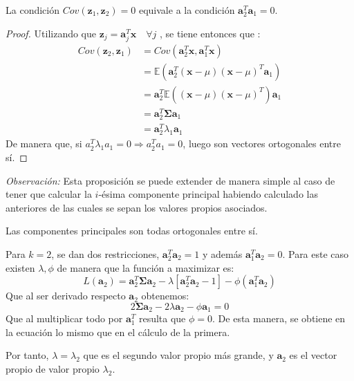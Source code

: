 \begin{propo}
La condición $Cov(\textbf{z}_1,\textbf{z}_2)=0 $ equivale a la condición $\textbf{a}_2^T\textbf{a}_1 = 0$.
\begin{proof}
Utilizando que $\textbf{z}_j=\textbf{a}_j^T \textbf{x}\quad \forall j$ , se tiene entonces que :
\begin{align*}
Cov(\textbf{z}_2,\textbf{z}_1)&= Cov (\textbf{a}_2^T\textbf{x},\textbf{a}_1^T\textbf{x})\\ 
&= \mathbb{E}(\textbf{a}_2^T(\textbf{x}-\mu)(\textbf{x}-\mu)^T \textbf{a}_1)\\
&= \textbf{a}_2^T \mathbb{E}((\textbf{x}-\mu)(\textbf{x}-\mu)^T) \textbf{a}_1\\
&= \textbf{a}_2^T \mathbf{\Sigma} \textbf{a}_1 \\
&= \textbf{a}_2^T \lambda_1 \textbf{a}_1
\end{align*}
\noindent De manera que, si $a_2^T \lambda_1 a_1 = 0 \Rightarrow a_2^T a_1=0 $, luego son vectores ortogonales entre sí.
\end{proof}
\end{propo}


\noindent \emph{Observación: } Esta proposición se puede extender de manera simple al caso de tener que calcular la $i$-ésima componente principal habiendo calculado las anteriores de las cuales se sepan los valores propios asociados. 

\begin{coro}
Las componentes principales son todas ortogonales entre sí. 
\end{coro}

\noindent Para $k=2$, se dan dos restricciones, $\textbf{a}_2^T\textbf{a}_2=1$ y además $\textbf{a}_1^T \textbf{a}_2=0$. Para este caso existen $\lambda, \phi$ de manera que la función a maximizar es:
\begin{equation}
 L(\textbf{a}_2)=\textbf{a}_2^T \mathbf{\Sigma} \textbf{a}_2 - \lambda[\textbf{a}_2^T \textbf{a}_2-1]-\phi(\textbf{a}_1^T \textbf{a}_2)
\end{equation}
Que al ser derivado respecto $\textbf{a}_2$ obtenemos:
\begin{equation}
2\mathbf{\Sigma} \textbf{a}_2 - 2\lambda\textbf{a}_2-\phi \textbf{a}_1=0
\end{equation}
Que al multiplicar todo por $\textbf{a}_1^T$ resulta que $\phi=0$. De esta manera, se obtiene en la ecuación lo mismo que en el cálculo de la primera. 

\noindent Por tanto, $\lambda=\lambda_2$ que es el segundo valor propio más grande, y $\textbf{a}_2$ es el vector propio de valor propio $\lambda_2$.

